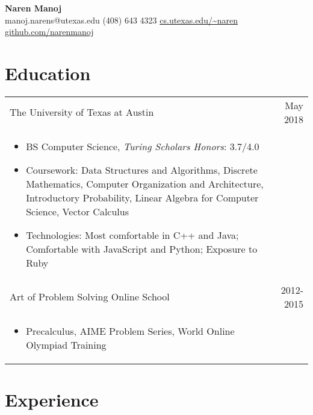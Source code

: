 \documentclass[9pt]{extarticle}
\begin{document}
\begin{center}
\huge \textbf{Naren Manoj} \\
\vspace{2mm}
\normalsize manoj.narens@utexas.edu \hspace{1mm}
\textbullet \hspace{1mm} (408) 643 4323 \hspace{1mm} \textbullet \hspace{1mm} \url{cs.utexas.edu/~naren} \hspace{1mm} \textbullet \hspace{1mm} \url{github.com/narenmanoj}
\end{center}

\normalsize

\section*{Education}

\begin{tabularx}{\textwidth}{X r }
    The University of Texas at Austin & May 2018 \\
    \vspace{-2mm}
    \begin{itemize}[noitemsep,topsep=0pt]
        \item BS Computer Science, \emph{Turing Scholars Honors}: 3.7/4.0
        \item Coursework: Data Structures and Algorithms, Discrete Mathematics, Computer Organization and Architecture,
                Introductory Probability, Linear Algebra for Computer Science, Vector Calculus
        \item Technologies: Most comfortable in C++ and Java; Comfortable with JavaScript and Python; Exposure to Ruby
    \end{itemize} & \\
    Art of Problem Solving Online School & 2012-2015 \\
    \vspace{-2mm}
    \begin{itemize}[noitemsep,topsep=0pt]
        \item Precalculus, AIME Problem Series, World Online Olympiad Training
    \end{itemize} & \\
\end{tabularx}

\section*{Experience}
\end{document}
